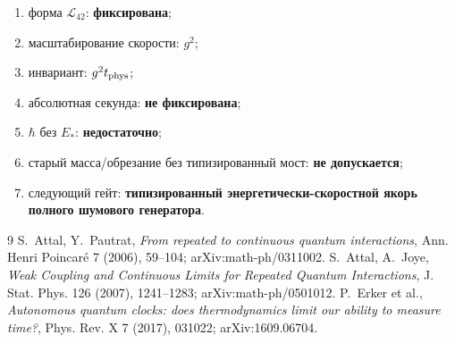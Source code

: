\begin{protocol}
\begin{enumerate}
 \item форма $\mathcal L_{42}$: \textbf{фиксирована};
 \item масштабирование скорости: \textbf{$g^2$};
 \item инвариант: \textbf{$g^2t_{\rm phys}$};
 \item абсолютная секунда: \textbf{не фиксирована};
 \item $\hbar$ без $E_*$: \textbf{недостаточно};
 \item старый масса/обрезание без типизированный мост: \textbf{не допускается};
 \item следующий гейт: \textbf{типизированный энергетически-скоростной якорь полного
       шумового генератора}.
\end{enumerate}
\end{protocol}

\begin{thebibliography}{9}
S.~Attal, Y.~Pautrat,
\emph{From repeated to continuous quantum interactions},
Ann. Henri Poincar\'e 7 (2006), 59--104; arXiv:math-ph/0311002.
S.~Attal, A.~Joye,
\emph{Weak Coupling and Continuous Limits for Repeated Quantum Interactions},
J. Stat. Phys. 126 (2007), 1241--1283; arXiv:math-ph/0501012.
P.~Erker et al.,
\emph{Autonomous quantum clocks: does thermodynamics limit our ability to
measure time?}, Phys. Rev. X 7 (2017), 031022; arXiv:1609.06704.
\end{thebibliography}